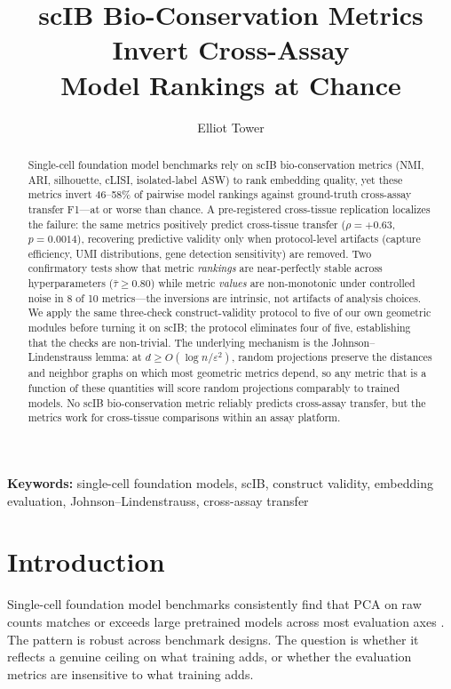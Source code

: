 \documentclass[11pt]{article}
\title{scIB Bio-Conservation Metrics Invert Cross-Assay\\Model Rankings at Chance}
\author{Elliot Tower}
\affil{Independent Researcher \\ \texttt{elliot@elliottower.ai}}
\date{}
\begin{document}
\linenumbers
\maketitle

\begin{abstract}
Single-cell foundation model benchmarks rely on scIB bio-conservation metrics (NMI, ARI, silhouette, cLISI, isolated-label ASW) to rank embedding quality, yet these metrics invert 46--58\% of pairwise model rankings against ground-truth cross-assay transfer F1---at or worse than chance. A pre-registered cross-tissue replication localizes the failure: the same metrics positively predict cross-tissue transfer ($\rho = +0.63$, $p = 0.0014$), recovering predictive validity only when protocol-level artifacts (capture efficiency, UMI distributions, gene detection sensitivity) are removed. Two confirmatory tests show that metric \emph{rankings} are near-perfectly stable across hyperparameters ($\bar{\tau} \geq 0.80$) while metric \emph{values} are non-monotonic under controlled noise in 8 of 10 metrics---the inversions are intrinsic, not artifacts of analysis choices. We apply the same three-check construct-validity protocol to five of our own geometric modules before turning it on scIB; the protocol eliminates four of five, establishing that the checks are non-trivial. The underlying mechanism is the Johnson--Lindenstrauss lemma: at $d \geq O(\log n / \varepsilon^2)$, random projections preserve the distances and neighbor graphs on which most geometric metrics depend, so any metric that is a function of these quantities will score random projections comparably to trained models. No scIB bio-conservation metric reliably predicts cross-assay transfer, but the metrics work for cross-tissue comparisons within an assay platform.
\end{abstract}

\noindent\textbf{Keywords:} single-cell foundation models, scIB, construct validity, embedding evaluation, Johnson--Lindenstrauss, cross-assay transfer


\section{Introduction}
\label{sec:intro}

Single-cell foundation model benchmarks consistently find that PCA on raw counts matches or exceeds large pretrained models across most evaluation axes \citep{wu2025scfm, vcbench2026, unifiedscfm2026, cellxgeneintegration2026}. The pattern is robust across benchmark designs. The question is whether it reflects a genuine ceiling on what training adds, or whether the evaluation metrics are insensitive to what training adds.
\end{document}
